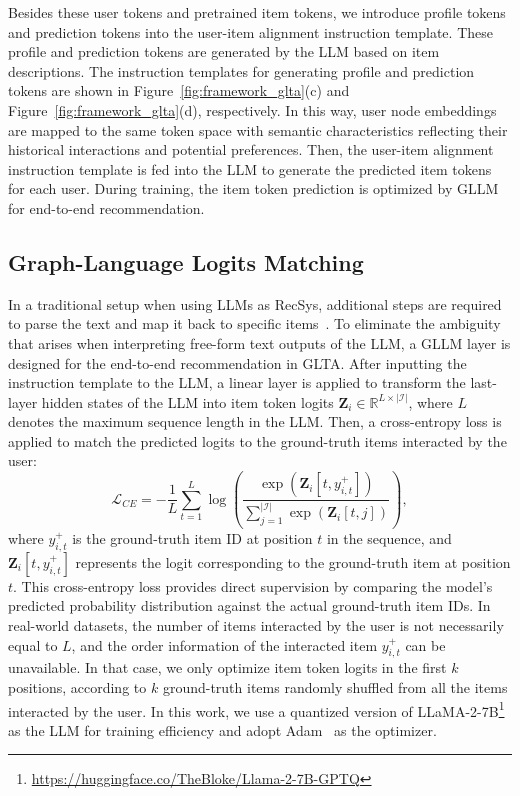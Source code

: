 Besides these user tokens and pretrained item tokens, we introduce profile tokens and prediction tokens into the user-item alignment instruction template. These profile and prediction tokens are generated by the LLM based on item descriptions. The instruction templates for generating profile and prediction tokens are shown in Figure~\ref{fig:framework_glta}(c) and Figure~\ref{fig:framework_glta}(d), respectively. In this way, user node embeddings are mapped to the same token space with semantic characteristics reflecting their historical interactions and potential preferences. Then, the user-item alignment instruction template is fed into the LLM to generate the predicted item tokens for each user. During training, the item token prediction is optimized by GLLM for end-to-end recommendation. 

\subsection{Graph-Language Logits Matching}\label{sec:GLLM}
In a traditional setup when using LLMs as RecSys, additional steps are required to parse the text and map it back to specific items~\cite{graphgpt,p5}.
To eliminate the ambiguity that arises when interpreting free-form text outputs of the LLM, a GLLM layer is designed for the end-to-end recommendation in GLTA. After inputting the instruction template to the LLM, a linear layer is applied to transform the last-layer hidden states of the LLM into item token logits $\mathbf{Z}_{i}\in \mathbb{R}^{L\times |\mathcal{I}|}$, where $L$ denotes the maximum sequence length in the LLM. Then, a cross-entropy loss is applied to match the predicted logits to the ground-truth items interacted by the user:
\begin{equation}
    \mathcal{L}_{CE} = -\frac{1}{L} \sum_{t=1}^{L} \log \left( \frac{\exp\left( \mathbf{Z}_i[t, y_{i,t}^+] \right)}{\sum_{j=1}^{|\mathcal{I}|} \exp\left( \mathbf{Z}_i[t, j] \right)} \right),
\end{equation}
where $y_{i,t}^+$ is the ground-truth item ID at position $t$ in the sequence, and $\mathbf{Z}_i[t, y_{i,t}^+]$ represents the logit corresponding to the ground-truth item at position $t$. This cross-entropy loss provides direct supervision by comparing the model's predicted probability distribution against the actual ground-truth item IDs. In real-world datasets, the number of items interacted by the user is not necessarily equal to $L$, and the order information of the interacted item $y_{i,t}^+$ can be unavailable. In that case, we only optimize item token logits in the first $k$ positions, according to $k$ ground-truth items randomly shuffled from all the items interacted by the user. In this work, we use a quantized version of LLaMA-2-7B\footnote{\url{https://huggingface.co/TheBloke/Llama-2-7B-GPTQ}} as the LLM for training efficiency and adopt Adam~\cite{Adam} as the optimizer. 



